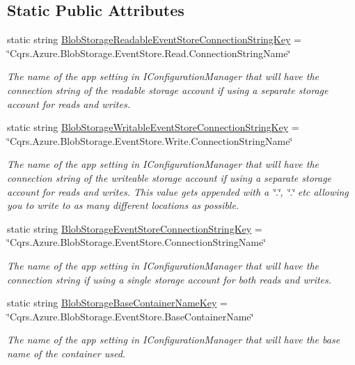 \subsection*{Static Public Attributes}
\begin{DoxyCompactItemize}
\item 
static string \hyperlink{classCqrs_1_1Azure_1_1BlobStorage_1_1Events_1_1BlobStorageEventStoreConnectionStringFactory_a2b233edf7ad4cbc29872757006319527_a2b233edf7ad4cbc29872757006319527}{Blob\+Storage\+Readable\+Event\+Store\+Connection\+String\+Key} = \char`\"{}Cqrs.\+Azure.\+Blob\+Storage.\+Event\+Store.\+Read.\+Connection\+String\+Name\char`\"{}
\begin{DoxyCompactList}\small\item\em The name of the app setting in I\+Configuration\+Manager that will have the connection string of the readable storage account if using a separate storage account for reads and writes. \end{DoxyCompactList}\item 
static string \hyperlink{classCqrs_1_1Azure_1_1BlobStorage_1_1Events_1_1BlobStorageEventStoreConnectionStringFactory_a3bf39254f211e4fbcbd9bc108c8d9fbc_a3bf39254f211e4fbcbd9bc108c8d9fbc}{Blob\+Storage\+Writable\+Event\+Store\+Connection\+String\+Key} = \char`\"{}Cqrs.\+Azure.\+Blob\+Storage.\+Event\+Store.\+Write.\+Connection\+String\+Name\char`\"{}
\begin{DoxyCompactList}\small\item\em The name of the app setting in I\+Configuration\+Manager that will have the connection string of the writeable storage account if using a separate storage account for reads and writes. This value gets appended with a \char`\"{}.\char`\"{}, \char`\"{}.\char`\"{} etc allowing you to write to as many different locations as possible. \end{DoxyCompactList}\item 
static string \hyperlink{classCqrs_1_1Azure_1_1BlobStorage_1_1Events_1_1BlobStorageEventStoreConnectionStringFactory_a36edb24cf0ef60114fc344b5d0bb619d_a36edb24cf0ef60114fc344b5d0bb619d}{Blob\+Storage\+Event\+Store\+Connection\+String\+Key} = \char`\"{}Cqrs.\+Azure.\+Blob\+Storage.\+Event\+Store.\+Connection\+String\+Name\char`\"{}
\begin{DoxyCompactList}\small\item\em The name of the app setting in I\+Configuration\+Manager that will have the connection string if using a single storage account for both reads and writes. \end{DoxyCompactList}\item 
static string \hyperlink{classCqrs_1_1Azure_1_1BlobStorage_1_1Events_1_1BlobStorageEventStoreConnectionStringFactory_affd6198f87e483bd7a6f5930a5eaa431_affd6198f87e483bd7a6f5930a5eaa431}{Blob\+Storage\+Base\+Container\+Name\+Key} = \char`\"{}Cqrs.\+Azure.\+Blob\+Storage.\+Event\+Store.\+Base\+Container\+Name\char`\"{}
\begin{DoxyCompactList}\small\item\em The name of the app setting in I\+Configuration\+Manager that will have the base name of the container used. \end{DoxyCompactList}\end{DoxyCompactItemize}
